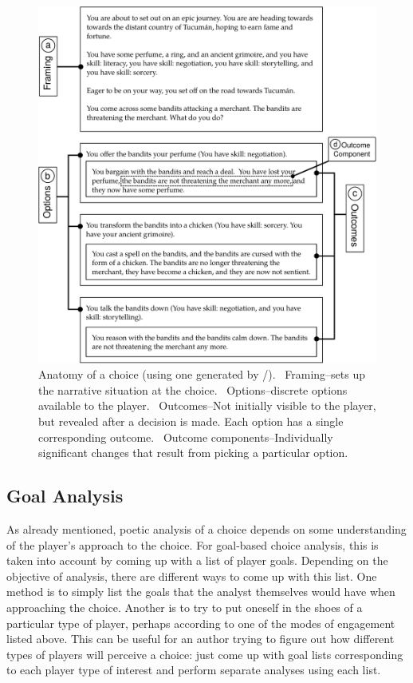 \begin{figure}[!p]
\centering
\includegraphics[width=\textwidth]{fig/choice-anatomy-crop.pdf}
\caption[Anatomy of a choice]{%
Anatomy of a choice (using one generated by \dunyazad/). ~Framing--sets up the narrative situation at the choice. ~Options--discrete options available to the player. ~Outcomes--Not initially visible to the player, but revealed after a decision is made. Each option has a single corresponding outcome. ~Outcome components--Individually significant changes that result from picking a particular option.}
\label{fig:choice-anatomy}
\end{figure}


\subsection{Goal Analysis}

\label{sec:cp-goal-analysis}

As already mentioned, poetic analysis of a choice depends on some understanding of the player's approach to the choice.
%
For goal-based choice analysis, this is taken into account by coming up with a list of player goals.
%
Depending on the objective of analysis, there are different ways to come up with this list.
%
One method is to simply list the goals that the analyst themselves would have when approaching the choice.
%
Another is to try to put oneself in the shoes of a particular type of player, perhaps according to one of the modes of engagement listed above.
%
This can be useful for an author trying to figure out how different types of players will perceive a choice: just come up with goal lists corresponding to each player type of interest and perform separate analyses using each list.


